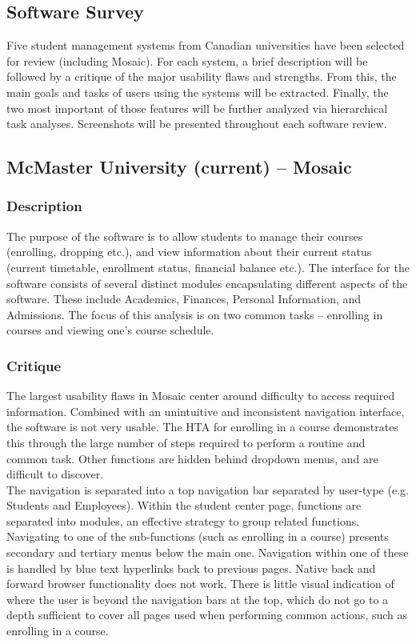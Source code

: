 \documentclass[10pt]{article}
\begin{document}
\begin{multicols}{2}
\section*{Software Survey}
Five student management systems from Canadian universities have been selected for review (including Mosaic). For each system, a brief description will be followed by a critique of the major usability flaws and strengths. From this, the main goals and tasks of users using the systems will be extracted. Finally, the two most important of those features will be further analyzed via hierarchical task analyses. Screenshots will be presented throughout each software review.

\subsection*{McMaster University (current) -- Mosaic}
\subsubsection*{Description}
The purpose of the software is to allow students to manage their courses (enrolling, dropping etc.), and view information about their current status (current timetable, enrollment status, financial balance etc.). The interface for the software consists of several distinct modules encapsulating different aspects of the software. These include Academics, Finances, Personal Information, and Admissions. The focus of this analysis is on two common tasks -- enrolling in courses and viewing one's course schedule.

\subsubsection*{Critique}
The largest usability flaws in Mosaic center around difficulty to access required information. Combined with an unintuitive and inconsistent navigation interface, the software is not very usable. The HTA for enrolling in a course demonstrates this through the large number of steps required to perform a routine and common task. Other functions are hidden behind dropdown menus, and are difficult to discover.\\

The navigation is separated into a top navigation bar separated by user-type (e.g. Students and Employees). Within the student center page, functions are separated into modules, an effective strategy to group related functions. Navigating to one of the sub-functions (such as enrolling in a course) presents secondary and tertiary menus below the main one. Navigation within one of these is handled by blue text hyperlinks back to previous pages. Native back and forward browser functionality does not work. There is little visual indication of where the user is beyond the navigation bars at the top, which do not go to a depth sufficient to cover all pages used when performing common actions, such as enrolling in a course.


\end{multicols}
\end{document}
